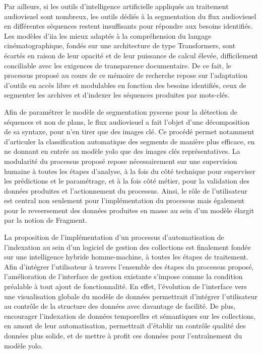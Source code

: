 Par ailleurs, si les outils d'intelligence artificielle appliqués au traitement audiovisuel sont nombreux, les outils dédiés à la segmentation du flux audiovisuel en différentes séquences restent insuffisants pour répondre aux besoins identifiés. Les modèles d'i\gls{ia} les mieux adaptés à la compréhension du langage cinématographique, fondés sur une architecture de type \gls{Transformers}, sont écartés en raison de leur opacité et de leur puissance de calcul élevée, difficilement conciliable avec les exigences de transparence documentaire. De ce fait, le processus proposé au cours de ce mémoire de recherche repose sur l'adaptation d'outils en accès libre et modulables en fonction des besoins identifiés, ceux de segmenter les archives et d'indexer les séquences produites par mots-clés.

Afin de paramétrer le modèle de segmentation \gls{pyscene} pour la détection de séquences et non de plans, le flux audiovisuel a fait l'objet d'une décomposition de sa syntaxe, pour n'en tirer que des images clé. Ce procédé permet notamment d'articuler la classification automatique des segments de manière plus efficace, en ne donnant en entrée au modèle \gls{yolo} que des images clés représentatives.  
La modularité du processus proposé repose nécessairement sur une supervision humaine à toutes les étapes d'analyse, à la fois du côté technique pour superviser les prédictions et le paramétrage, et à la fois côté métier, pour la validation des données produites et l'actionnement du processus. Ainsi, le rôle de l'utilisateur est central non seulement pour l'implémentation du processus mais également pour le reveersement des données produites en masse au sein d'un modèle élargit par la notion de Fragment.

La proposition de l'implémentation d'un processus d'automatisation de l'indexation au sein d'un logiciel de gestion des collections est finalement fondée sur une intelligence hybride homme-machine, à toutes les étapes de traitement. Afin d'intégrer l'utilisateur à travers l'ensemble des étapes du processus proposé, l'amélioration de l'interface de gestion existante s'impose comme la condition préalable à tout ajout de fonctionnalité. En effet, l'évolution de l'interface vers une visualisation globale du modèle de données permettrait d'intégrer l'utilisateur au contrôle de la structure des données avec davantage de facilité. De plus, encourager l'indexation de données temporelles et sémantiques sur les collections, en amont de leur automatisation, permettrait d'établir un contrôle qualité des données plus solide, et de mettre à profit ces données pour l'entraînement du modèle \gls{yolo}. 

